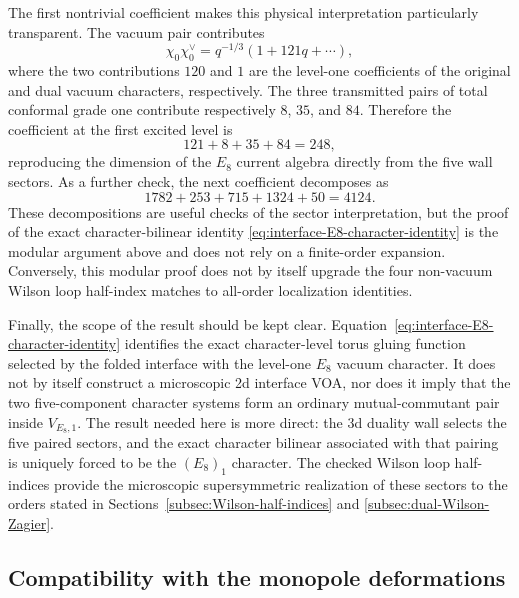 \documentclass[11pt,a4paper]{article}
\numberwithin{equation}{section}
\begin{document}
The first nontrivial coefficient makes this physical interpretation particularly transparent.  The vacuum pair contributes
\begin{equation}
  \chi_0\chi_0^\vee
  =q^{-1/3}\left(1+121q+\cdots\right),
\end{equation}
where the two contributions $120$ and $1$ are the level-one coefficients of the original and dual vacuum characters, respectively.  The three transmitted pairs of total conformal grade one contribute respectively $8$, $35$, and $84$.  Therefore the coefficient at the first excited level is
\begin{equation}
  121+8+35+84=248,
  \label{eq:interface-E8-248-decomposition}
\end{equation}
reproducing the dimension of the $E_8$ current algebra directly from the five wall sectors.  As a further check, the next coefficient decomposes as
\begin{equation}
  1782+253+715+1324+50=4124.
  \label{eq:interface-E8-4124-decomposition}
\end{equation}
These decompositions are useful checks of the sector interpretation, but the proof of the exact character-bilinear identity \eqref{eq:interface-E8-character-identity} is the modular argument above and does not rely on a finite-order expansion.  Conversely, this modular proof does not by itself upgrade the four non-vacuum Wilson loop half-index matches to all-order localization identities.

Finally, the scope of the result should be kept clear.  Equation~\eqref{eq:interface-E8-character-identity} identifies the exact character-level torus gluing function selected by the folded interface with the level-one $E_8$ vacuum character.  It does not by itself construct a microscopic 2d interface VOA, nor does it imply that the two five-component character systems form an ordinary mutual-commutant pair inside $V_{E_8,1}$.  The result needed here is more direct: the 3d duality wall selects the five paired sectors, and the exact character bilinear associated with that pairing is uniquely forced to be the $(E_8)_1$ character.  The checked Wilson loop half-indices provide the microscopic supersymmetric realization of these sectors to the orders stated in Sections~\ref{subsec:Wilson-half-indices} and \ref{subsec:dual-Wilson-Zagier}.


\subsection{Compatibility with the monopole deformations}
\label{subsec:interface-monopole-deformations}
\end{document}
